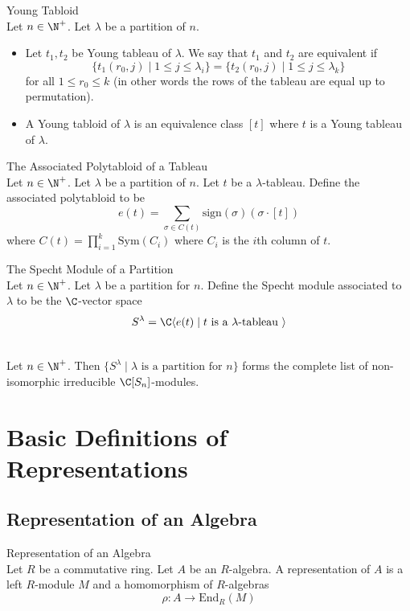 \documentclass[a4paper]{article}
\begin{document}
\begin{defn}{Young Tabloid}{}\\
Let $n\in\N^+$. Let $\lambda$ be a partition of $n$. 
\begin{itemize}
\item Let $t_1,t_2$ be Young tableau of $\lambda$. We say that $t_1$ and $t_2$ are equivalent if $$\{t_1(r_0,j)\;|\;1\leq j\leq\lambda_i\}=\{t_2(r_0,j)\;|\;1\leq j\leq\lambda_k\}$$ for all $1\leq r_0\leq k$ (in other words the rows of the tableau are equal up to permutation). 
\item A Young tabloid of $\lambda$ is an equivalence class $[t]$ where $t$ is a Young tableau of $\lambda$. 
\end{itemize}
\end{defn}

\begin{defn}{The Associated Polytabloid of a Tableau}{}\\
Let $n\in\N^+$. Let $\lambda$ be a partition of $n$. Let $t$ be a $\lambda$-tableau. Define the associated polytabloid to be $$e(t)=\sum_{\sigma\in C(t)}\text{sign}(\sigma)(\sigma\cdot[t])$$ where $C(t)=\prod_{i=1}^k\text{Sym}(C_i)$ where $C_i$ is the $i$th column of $t$. 
\end{defn}

\begin{defn}{The Specht Module of a Partition}{}\\
Let $n\in\N^+$. Let $\lambda$ be a partition for $n$. Define the Specht module associated to $\lambda$ to be the $\C$-vector space $$S^\lambda=\C\langle e(t)\;|\;t\text{ is a }\lambda\text{-tableau }\rangle$$
\end{defn}

\begin{thm}{}{}\\
Let $n\in\N^+$. Then $\{S^\lambda\;|\;\lambda\text{ is a partition for }n\}$ forms the complete list of non-isomorphic irreducible $\C[S_n]$-modules. 
\end{thm}

\pagebreak
\section{Basic Definitions of Representations}
\subsection{Representation of an Algebra}
\begin{defn}{Representation of an Algebra}{}\\
Let $R$ be a commutative ring. Let $A$ be an $R$-algebra. A representation of $A$ is a left $R$-module $M$ and a homomorphism of $R$-algebras $$\rho:A\to\text{End}_R(M)$$
\end{defn}
\end{document}
